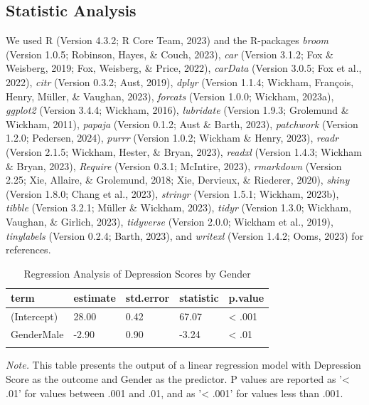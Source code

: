 \documentclass[
  man,floatsintext]{apa6}
\begin{document}
\hypertarget{statistic-analysis}{%
\subsection{Statistic Analysis}\label{statistic-analysis}}

We used R (Version 4.3.2; R Core Team, 2023) and the R-packages \emph{broom} (Version 1.0.5; Robinson, Hayes, \& Couch, 2023), \emph{car} (Version 3.1.2; Fox \& Weisberg, 2019; Fox, Weisberg, \& Price, 2022), \emph{carData} (Version 3.0.5; Fox et al., 2022), \emph{citr} (Version 0.3.2; Aust, 2019), \emph{dplyr} (Version 1.1.4; Wickham, François, Henry, Müller, \& Vaughan, 2023), \emph{forcats} (Version 1.0.0; Wickham, 2023a), \emph{ggplot2} (Version 3.4.4; Wickham, 2016), \emph{lubridate} (Version 1.9.3; Grolemund \& Wickham, 2011), \emph{papaja} (Version 0.1.2; Aust \& Barth, 2023), \emph{patchwork} (Version 1.2.0; Pedersen, 2024), \emph{purrr} (Version 1.0.2; Wickham \& Henry, 2023), \emph{readr} (Version 2.1.5; Wickham, Hester, \& Bryan, 2023), \emph{readxl} (Version 1.4.3; Wickham \& Bryan, 2023), \emph{Require} (Version 0.3.1; McIntire, 2023), \emph{rmarkdown} (Version 2.25; Xie, Allaire, \& Grolemund, 2018; Xie, Dervieux, \& Riederer, 2020), \emph{shiny} (Version 1.8.0; Chang et al., 2023), \emph{stringr} (Version 1.5.1; Wickham, 2023b), \emph{tibble} (Version 3.2.1; Müller \& Wickham, 2023), \emph{tidyr} (Version 1.3.0; Wickham, Vaughan, \& Girlich, 2023), \emph{tidyverse} (Version 2.0.0; Wickham et al., 2019), \emph{tinylabels} (Version 0.2.4; Barth, 2023), and \emph{writexl} (Version 1.4.2; Ooms, 2023) for references.

\begin{table}[tbp]

\begin{center}
\begin{threeparttable}

\caption{\label{tab:regression-depression-gender}Regression Analysis of Depression Scores by Gender}

\begin{tabular}{lllll}
\toprule
term & \multicolumn{1}{c}{estimate} & \multicolumn{1}{c}{std.error} & \multicolumn{1}{c}{statistic} & \multicolumn{1}{c}{p.value}\\
\midrule
(Intercept) & 28.00 & 0.42 & 67.07 & < .001\\
GenderMale & -2.90 & 0.90 & -3.24 & < .01\\
\bottomrule
\addlinespace
\end{tabular}

\begin{tablenotes}[para]
\normalsize{\textit{Note.} This table presents the output of a linear regression model with Depression Score as the outcome and Gender as the predictor. P values are reported as '< .01' for values between .001 and .01, and as '< .001' for values less than .001.}
\end{tablenotes}

\end{threeparttable}
\end{center}

\end{table}
\end{document}
